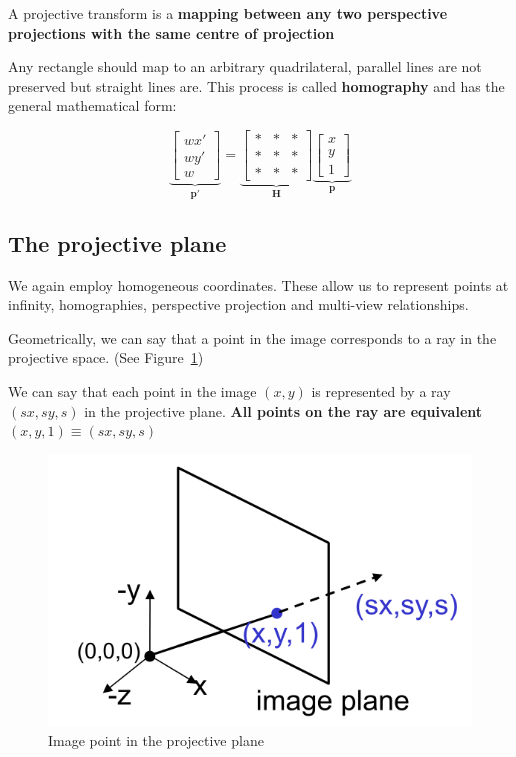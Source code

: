 \documentclass{article}
\begin{document}
A projective transform is a \textbf{mapping between any two perspective projections with the same centre of projection}

Any rectangle should map to an arbitrary quadrilateral, parallel lines are not preserved but straight lines are. This process is called \textbf{homography} and has the general mathematical form:

\[
  \underbrace{\begin{bmatrix}
    wx' \\ wy' \\ w
  \end{bmatrix}}_{\mathbf{p'} } =
\underbrace{\begin{bmatrix}
  *&*&*\\ *&*&* \\ *&*&*
\end{bmatrix}}_{\mathbf{H} }\underbrace{\begin{bmatrix}
x \\ y \\ 1
\end{bmatrix}}_{\mathbf{p} }
\]

\subsection{The projective plane}

We again employ homogeneous coordinates. These allow us to represent points at infinity, homographies, perspective projection and multi-view relationships.

Geometrically, we can say that a point in the image corresponds to a ray in the projective space. (See Figure~\ref{fig:projectiveplane})

We can say that each point in the image $(x,y)$ is represented by a ray $(sx,sy,s)$ in the projective plane. \textbf{All points on the ray are equivalent $(x,y,1) \equiv (sx,sy,s)$}

\begin{figure}[ht]
  \centering
  \includegraphics[scale=0.4]{figures/l5-3.png}
  \caption{\label{fig:projectiveplane} Image point in the projective plane}
\end{figure}
\end{document}
